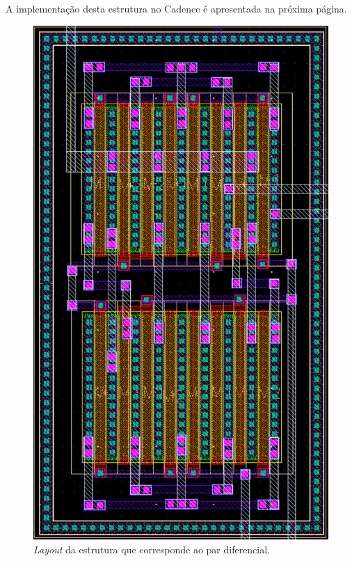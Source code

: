 \documentclass[11pt]{article}
\numberwithin{equation}{section}
\begin{document}
A implementação desta estrutura no Cadence é apresentada na próxima página.

\pagebreak

\begin{figure}[H]
	\centering
	\includegraphics[keepaspectratio=true, scale=0.65]{exps/layout/pardiferencial}
	\vspace{-0.5em}
	\caption{\textit{Layout} da estrutura que corresponde ao par diferencial.}
	\vspace{-0.8em}
\end{figure}
\end{document}
